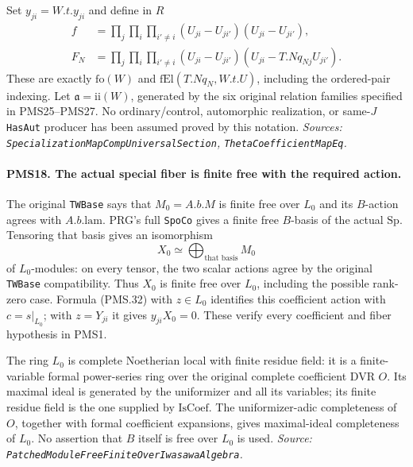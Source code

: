 Set $y_{ji}=W.t.y_{ji}$ and define in $R$
\[
 \begin{split}
 f&=\prod_j\prod_i\prod_{i'\ne i}
       (U_{ji}-U_{ji'})(U_{ji}-U_{ji'}),\\
 F_N&=\prod_j\prod_i\prod_{i'\ne i}
       (U_{ji}-U_{ji'})(U_{ji}-T.Nq_{Nj}U_{ji'}).
 \end{split}                                             \tag{PMS.33}
\]
These are exactly $\mathrm{fo}(W)$ and
$\mathrm{fEl}(T.Nq_N,W.t.U)$, including the ordered-pair
indexing.  Let $\mathfrak a=\mathrm{ii}(W)$, generated by the
six original relation families specified in PMS25--PMS27.
No ordinary/control, automorphic realization, or same-$J$
\texttt{HasAut} producer has been assumed proved by this notation.
\hfill\textit{Sources: \texttt{SpecializationMapCompUniversalSection},
\texttt{ThetaCoefficientMapEq}.}

\paragraph{PMS18. The actual special fiber is finite free with the required action.}
\label{claim:PMS18}
The original \texttt{TWBase} says that $M_0=A.b.M$ is finite
free over $L_0$ and its $B$-action agrees with $A.b.\mathrm{lam}$.
PRG's full \texttt{SpoCo} gives a finite free $B$-basis of the
actual $\mathrm{Sp}$.  Tensoring that basis gives an isomorphism
\[
 X_0\simeq\bigoplus_{\text{that basis}} M_0
\]
of $L_0$-modules: on every tensor, the two scalar actions agree
by the original \texttt{TWBase} compatibility.  Thus $X_0$ is
finite free over $L_0$, including the possible rank-zero case.
Formula (PMS.32) with $z\in L_0$ identifies this coefficient
action with $c=s|_{L_0}$; with $z=Y_{ji}$ it gives $y_{ji}X_0=0$.
These verify every coefficient and fiber hypothesis in PMS1.

The ring $L_0$ is complete Noetherian local with finite residue
field: it is a finite-variable formal power-series ring over
the original complete coefficient DVR $O$.  Its maximal ideal
is generated by the uniformizer and all its variables; its
finite residue field is the one supplied by $\mathrm{IsCoef}$.
The uniformizer-adic completeness of $O$, together with formal
coefficient expansions, gives maximal-ideal completeness of
$L_0$.  No assertion that $B$ itself is free over $L_0$ is used.
\hfill\textit{Source: \texttt{PatchedModuleFreeFiniteOverIwasawaAlgebra}.}

